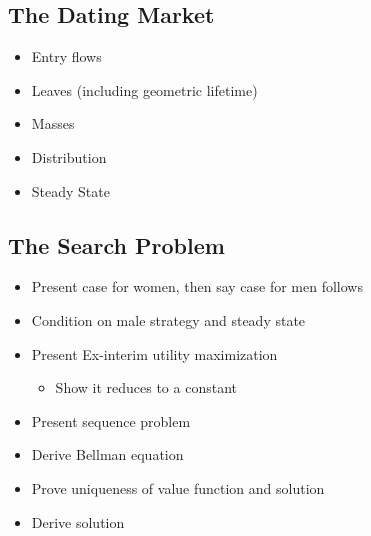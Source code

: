 \subsection{The Dating Market}
\begin{itemize}
    \item Entry flows
    \item Leaves (including geometric lifetime)
    \item Masses
    \item Distribution
    \item Steady State
\end{itemize}
\subsection{The Search Problem} 
\begin{itemize}
    \item Present case for women, then say case for men follows
    \item Condition on male strategy and steady state
    \item Present Ex-interim utility maximization
    \begin{itemize}
        \item Show it reduces to a constant
    \end{itemize} 
    \item Present sequence problem
    \item Derive Bellman equation
    \item Prove uniqueness of value function and solution
    \item Derive solution
\end{itemize}